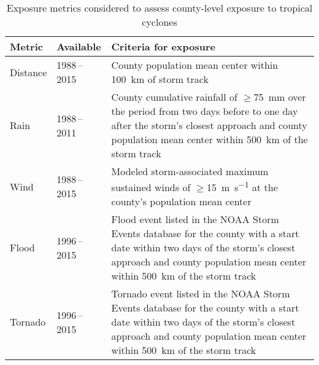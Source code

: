 \begin{table}%
\centering 
\caption{Exposure metrics considered to assess county-level exposure to 
tropical cyclones}
\begin{tabular}{p{1.5cm}p{2.5cm}p{10cm}} 
\toprule
Metric & Available & Criteria for exposure \\ \midrule 
Distance & 1988\,--\,2015 & County population mean center within 100~\si{\kilo\metre} of storm track \\ 
Rain & 1988\,--\,2011 & County cumulative rainfall of $\ge$75~\si{\milli\metre} over the period from two days before to 
one day after the storm's closest approach and county population mean center within 500~\si{\kilo\metre} of the 
storm track \\ 
Wind & 1988\,--\,2015 & Modeled storm-associated maximum sustained winds of $\ge$15~\si{\metre\per\second}
at the county's population mean center\\ 
Flood & 1996\,--\,2015 & Flood event listed in the \ac{NOAA} Storm Events database for the county with a start date within two days of the storm's closest approach and county population mean center within 500~\si{\kilo\metre} of the storm track \\
Tornado & 1996\,--\,2015 & Tornado event listed in the \ac{NOAA} Storm Events database for the county with a start date within two days of the storm's closest approach and county population mean center within 500~\si{\kilo\metre} of the storm track\\
\bottomrule 
\end{tabular} 
\label{tab:exposuremetrics} 
\end{table}

\clearpage


